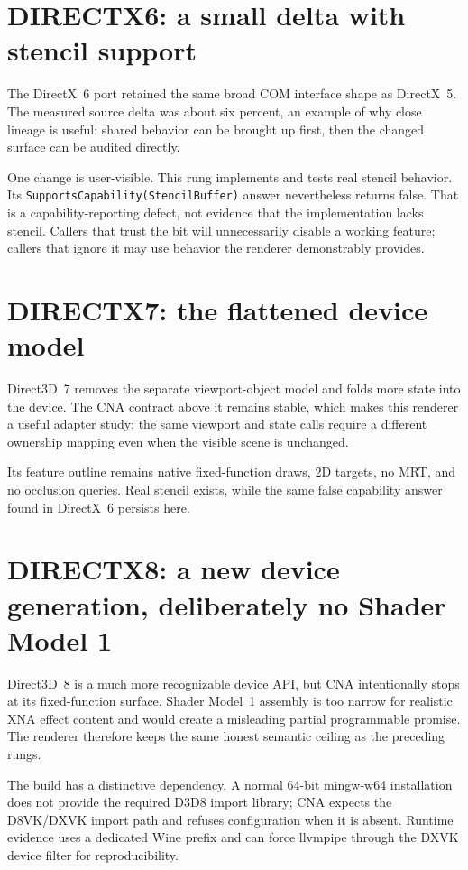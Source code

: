 \section{DIRECTX6: a small delta with stencil support}

The DirectX~6 port retained the same broad COM interface shape as DirectX~5.  The measured
source delta was about six percent, an example of why close lineage is useful: shared behavior
can be brought up first, then the changed surface can be audited directly.

One change is user-visible.  This rung implements and tests real stencil behavior.  Its
\texttt{SupportsCapability(StencilBuffer)} answer nevertheless returns false.  That is a
capability-reporting defect, not evidence that the implementation lacks stencil.  Callers
that trust the bit will unnecessarily disable a working feature; callers that ignore it may
use behavior the renderer demonstrably provides.

\section{DIRECTX7: the flattened device model}

Direct3D~7 removes the separate viewport-object model and folds more state into the device.
The CNA contract above it remains stable, which makes this renderer a useful adapter study:
the same viewport and state calls require a different ownership mapping even when the visible
scene is unchanged.

Its feature outline remains native fixed-function draws, 2D targets, no MRT, and no occlusion
queries.  Real stencil exists, while the same false capability answer found in DirectX~6
persists here.

\section{DIRECTX8: a new device generation, deliberately no Shader Model 1}

Direct3D~8 is a much more recognizable device API, but CNA intentionally stops at its
fixed-function surface.  Shader Model~1 assembly is too narrow for realistic XNA effect
content and would create a misleading partial programmable promise.  The renderer therefore
keeps the same honest semantic ceiling as the preceding rungs.

The build has a distinctive dependency.  A normal 64-bit mingw-w64 installation does not
provide the required D3D8 import library; CNA expects the D8VK/DXVK import path and refuses
configuration when it is absent.  Runtime evidence uses a dedicated Wine prefix and can
force llvmpipe through the DXVK device filter for reproducibility.

